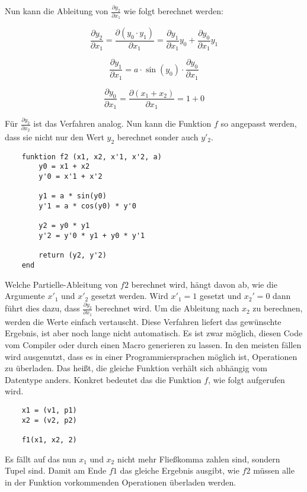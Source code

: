 Nun kann die Ableitung von $\frac{\partial y_2}{\partial x_1}$ wie folgt berechnet werden:

$$
	\frac{\partial y_2}{\partial x_1} = \frac{\partial (y_0 \cdot y_1)}{\partial x_1} = \frac{\partial  y_1}{\partial x_1} y_0  + \frac{\partial y_0 }{\partial x_1} y_1
$$

$$
	\frac{\partial y_1}{ \partial x_1 } = a \cdot \sin(y_0) \cdot \frac{\partial y_0}{\partial x_1}
$$

$$
	\frac{\partial y_0}{\partial x_1} = \frac{\partial (x_1 + x_2)}{\partial x_1} = 1 + 0
$$

Für $\frac{\partial y_2}{\partial x_2}$ ist das Verfahren analog. 
Nun kann die Funktion $f$ so angepasst werden, dass sie nicht nur den Wert $y_2$ berechnet sonder auch $y'_2$.

\begin{lstlisting}
    funktion f2 (x1, x2, x'1, x'2, a)
        y0 = x1 + x2
        y'0 = x'1 + x'2

        y1 = a * sin(y0)
        y'1 = a * cos(y0) * y'0

		y2 = y0 * y1
        y'2 = y'0 * y1 + y0 * y'1
        
        return (y2, y'2)
    end
\end{lstlisting}

Welche Partielle-Ableitung von $f2$ berechnet wird, hängt davon ab, wie die Argumente $x'_1$ und $x'_2$ gesetzt werden.
Wird $x'_1 = 1$ gesetzt und $x_2' = 0$ dann führt dies dazu, dass $\frac{\partial y_2}{\partial x_1}$ berechnet wird.
Um die Ableitung nach $x_2$ zu berechnen, werden die Werte einfach vertauscht.
Diese Verfahren liefert das gewünschte Ergebnis, ist aber noch lange nicht automatisch.
Es ist zwar möglich, diesen Code vom Compiler oder durch einen Macro generieren zu lassen.
In den meisten fällen wird ausgenutzt, dass es in einer 
Programmiersprachen möglich ist, Operationen zu überladen.
Das heißt, die gleiche Funktion verhält sich abhängig vom Datentype anders.
Konkret bedeutet das die Funktion $f$, wie folgt aufgerufen wird.

\begin{lstlisting}
	x1 = (v1, p1)
    x2 = (v2, p2)
    
    f1(x1, x2, 2)
\end{lstlisting}

Es fällt auf das nun $x_1$ und $x_2$ nicht mehr Fließkomma zahlen sind, sondern Tupel sind.
Damit am Ende $f1$ das gleiche Ergebnis ausgibt, wie $f2$ müssen alle in der Funktion vorkommenden Operationen überladen werden.


